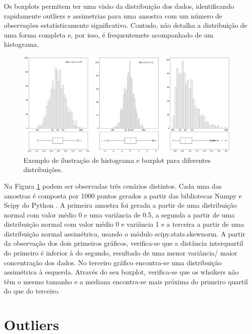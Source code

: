 Os boxplots permitem ter uma visão da distribuição dos dados, identificando rapidamente outliers e assimetrias para uma amostra com um número de observações estatisticamente significativo. Contudo, não detalha a distribuição de uma forma completa e, por isso, é frequentemete acompanhado de um histograma.



\begin{figure}[H]
	\centering
	\includegraphics[width=\textwidth]{imagens/stats/hist2.png}
	\caption{Exemplo de ilustração de histograma e boxplot para diferentes distribuições.}
	\label{fig:histos}
\end{figure}


Na Figura \ref{fig:histos} podem ser observadas três cenários distintos. Cada uma das amostras é composta por 1000 pontos gerados a partir das bibliotecas Numpy e Scipy do Python \cite{python}. A primeira amostra foi gerada a partir de uma distribuição normal com valor médio 0 e uma variância de 0.5, a segunda a partir de uma distribuição normal com valor médio 0 e variância 1 e a terceira a partir de uma distribuição normal assimétrica, usando o módulo scipy.stats.skewnorm. A partir da observação dos dois primeiros gráficos, verifica-se que a distância interquartil do primeiro é inferior à do segundo, resultado de uma menor variância/ maior concentração dos dados. No terceiro gráfico encontra-se uma distribuição assimétrica à esquerda. Através do seu boxplot, verifica-se que os whsikers não têm o mesmo tamanho e a mediana encontra-se mais próxima do primeiro quartil do que do terceiro. 


\section{Outliers}

























